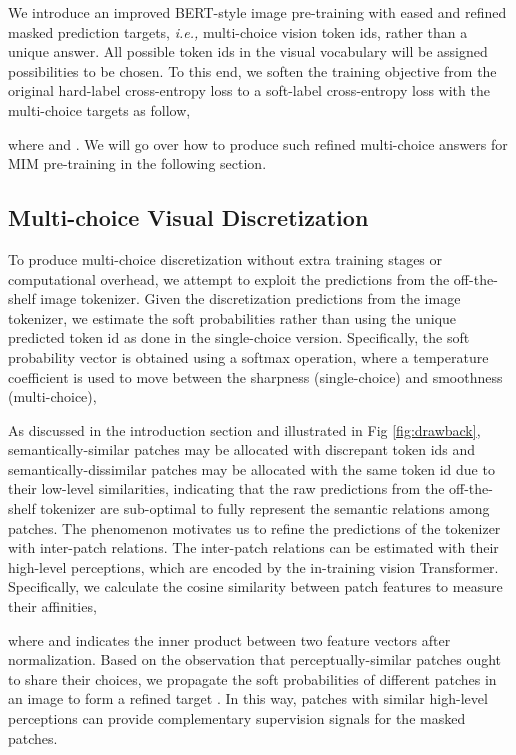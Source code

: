 \documentclass[runningheads]{llncs}
\begin{document}
We introduce an improved BERT-style image pre-training with eased and refined masked prediction targets, \textit{i.e.,} {multi-choice vision token ids}, rather than a unique answer. All possible token ids in the visual vocabulary will be assigned possibilities to be chosen. To this end, we soften the training objective from the original hard-label cross-entropy loss to a soft-label cross-entropy loss with the multi-choice targets  as follow,

where  and .
We will go over how to produce such refined multi-choice answers for MIM pre-training in the following section.







\subsection{Multi-choice Visual Discretization}

To produce multi-choice discretization without extra training stages or computational overhead, we attempt to exploit the predictions from the off-the-shelf image tokenizer.
Given the discretization predictions  from the image tokenizer,
we estimate the soft probabilities  rather than using the unique predicted token id as done in the single-choice version.
Specifically,
the soft probability vector is obtained using a softmax operation, where a temperature coefficient  is used to move between the sharpness (single-choice) and smoothness (multi-choice),





As discussed in the introduction section and illustrated in Fig \ref{fig:drawback}, semantically-similar patches may be allocated with discrepant token ids and semantically-dissimilar patches may be allocated with the same token id due to their low-level similarities, indicating that the raw predictions from the off-the-shelf tokenizer are sub-optimal to fully represent the semantic relations among patches. 
The phenomenon motivates us to refine the predictions of the tokenizer with inter-patch relations.
The inter-patch relations can be estimated with their high-level perceptions, which are encoded by the in-training vision Transformer.
Specifically, we calculate the cosine similarity between patch features to measure their affinities,

where  and  indicates the inner product between two feature vectors after  normalization.
Based on the observation that perceptually-similar patches ought to share their choices, we propagate the soft probabilities  of different patches in an image  to form a refined target . In this way, patches with similar high-level perceptions can provide complementary supervision signals for the masked patches.
\end{document}
